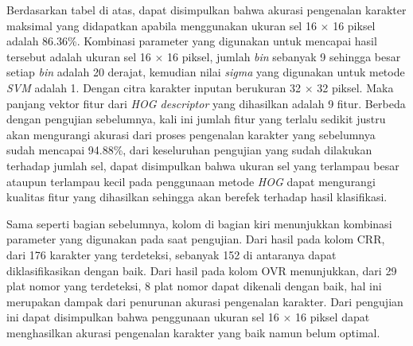 Berdasarkan tabel di atas, dapat disimpulkan bahwa akurasi pengenalan karakter maksimal yang didapatkan apabila menggunakan ukuran sel 16 $\times$ 16 piksel adalah 86.36\%. Kombinasi parameter yang digunakan untuk mencapai hasil tersebut adalah ukuran sel 16 $\times$ 16 piksel, jumlah \textit{bin} sebanyak 9 sehingga besar setiap \textit{bin} adalah 20 derajat, kemudian nilai \textit{sigma} yang digunakan untuk metode \textit{SVM} adalah 1. Dengan citra karakter inputan berukuran 32 $\times$ 32 piksel. Maka panjang vektor fitur dari \textit{HOG descriptor} yang dihasilkan adalah 9 fitur. Berbeda dengan pengujian sebelumnya, kali ini jumlah fitur yang terlalu sedikit justru akan mengurangi akurasi dari proses pengenalan karakter yang sebelumnya sudah mencapai 94.88\%, dari keseluruhan pengujian yang sudah dilakukan terhadap jumlah sel, dapat disimpulkan bahwa ukuran sel yang terlampau besar ataupun terlampau kecil pada penggunaan metode \textit{HOG} dapat mengurangi kualitas fitur yang dihasilkan sehingga akan berefek terhadap hasil klasifikasi.

Sama seperti bagian sebelumnya, kolom di bagian kiri menunjukkan kombinasi parameter yang digunakan pada saat pengujian. Dari hasil pada kolom CRR, dari 176 karakter yang terdeteksi, sebanyak 152 di antaranya dapat diklasifikasikan dengan baik. Dari hasil pada kolom OVR menunjukkan, dari 29 plat nomor yang terdeteksi, 8 plat nomor dapat dikenali dengan baik, hal ini merupakan dampak dari penurunan akurasi pengenalan karakter. Dari pengujian ini dapat  disimpulkan bahwa penggunaan ukuran sel 16 $\times$ 16 piksel dapat menghasilkan akurasi pengenalan karakter yang baik namun belum optimal.\\

\newpage